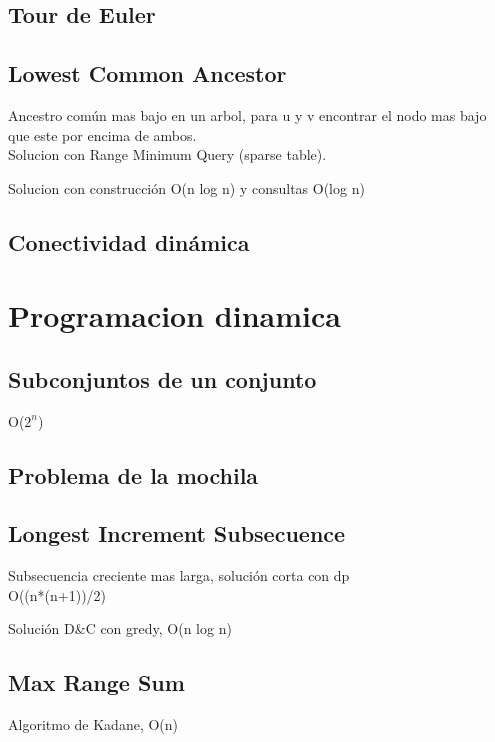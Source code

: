 \documentclass[10pt,landscape,twocolumn,letterpaper,twosided]{article}
\newcommand\cppfile[2][]{

}
\begin{document}
			\subsection{Tour de Euler}
			\cppfile[10-33]{grafos/tour_euleriano.cpp}
			\subsection{Lowest Common Ancestor}
			Ancestro común mas bajo en un arbol, para u y v encontrar el nodo mas bajo que este por encima de
			ambos.\\
			Solucion con Range Minimum Query (sparse table).
			\cppfile[38-65]{otros/Lowest_Common_Ancestor.cpp}
			Solucion con construcción O(n log n) y consultas O(log n)
			\cppfile[14-51]{otros/Lowest_Common_Ancestor_logN.cpp}
			\subsection{Conectividad dinámica}
			\cppfile[7-70]{grafos/conectividad_dinamica.cpp}			
			
		\section{Programacion dinamica}
			\subsection{Subconjuntos de un conjunto}
			O($2^{n}$)
			\cppfile[6-15]{programacion_dinamica/bitmask.cpp}
			\subsection{Problema de la mochila}
			\cppfile[8-23]{programacion_dinamica/knapsack.cpp}
			\subsection{Longest Increment Subsecuence}
			Subsecuencia creciente mas larga, solución corta con dp\\
			O((n*(n+1))/2)
			\cppfile[48-57]{programacion_dinamica/longest_increasing_subsequence.cpp}
			Solución D{\&}C con gredy, O(n log n)
			\cppfile[7-46]{programacion_dinamica/longest_increasing_subsequence.cpp}
			\subsection{Max Range Sum}
			Algoritmo de Kadane, O(n)
			\cppfile[6-22]{programacion_dinamica/Max_Range_Sum.cpp}
\end{document}
